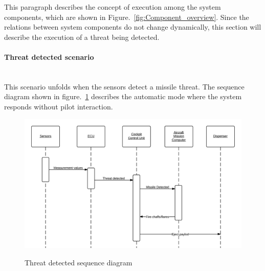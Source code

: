 This paragraph describes the concept of execution among the system components, which are shown in Figure.~\ref{fig:Component_overview}. Since the relations between system 
components do not change dynamically, this section will describe the execution of a threat being detected.

\paragraph{Threat detected scenario}\mbox{}\\
This scenario unfolds when the sensors detect a missile threat. The sequence diagram shown in figure.~\ref{fig:threatDetectedSeqDia} describes the automatic mode where the system responds without pilot 
interaction.

\begin{figure}[h]
	\centering
	\includegraphics[scale=0.2]{./images/threatDetectedSequenceDiagram.png}\\
	\caption{Threat detected sequence diagram}
    \label{fig:threatDetectedSeqDia}
\end{figure}

